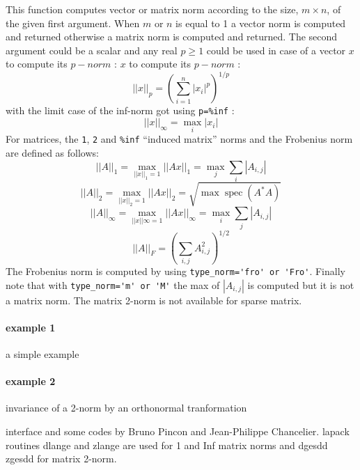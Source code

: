 \begin{mandescription}
This function computes vector or matrix norm according to the size, $m
\times n$, of the given first argument. When $m$ or $n$ is equal to 1 a vector
norm is computed and returned otherwise a matrix norm is computed and returned. 
The second argument could be a scalar and any real $p \ge 1$ could be used in case of a vector
$x$ to compute its $p-norm$ :
$x$ to compute its $p-norm$ :
$$
    ||x||_p = \left( \sum_{i=1}^n |x_i|^p \right)^{1/p}
$$
with the limit case of the inf-norm got using \verb+p=%inf+ :
$$
    ||x||_{\infty} = \max_i |x_i|
$$
For matrices, the \verb+1+, \verb+2+ and \verb+%inf+ ``induced matrix'' norms 
and the Frobenius norm are defined as follows:
$$
    ||A||_1 = \max_{||x||_1 = 1} ||Ax||_1 = \max_j \sum_i |A_{i,j}|  
$$
$$
    ||A||_2 = \max_{||x||_2 = 1} ||Ax||_2 = \sqrt{\max \mathop{\mathrm{spec}}(A^* A)}
$$
$$
    ||A||_{\infty} = \max_{||x||{\infty} = 1} ||Ax||_{\infty} = \max_i \sum_j |A_{i,j}|  
$$
$$
   ||A||_F =  \left( \sum_{i,j} A_{i,j}^2 \right)^{1/2}
$$
The Frobenius norm is computed by using  \verb+type_norm='fro' or 'Fro'+. 
Finally note that with \verb+type_norm='m' or 'M'+ the max 
of $|A_{i,j}|$ is computed but it is not a matrix norm.
The matrix 2-norm is not available for sparse matrix.
\end{mandescription}
\begin{examples}
\paragraph{example 1} a simple example
  \begin{program}
  \end{program}
\paragraph{example 2} invariance of a 2-norm by an orthonormal tranformation
  \begin{program}
  \end{program}
\end{examples}


\begin{authors}
   interface and some codes by Bruno Pincon and Jean-Philippe
   Chancelier. lapack routines dlange and zlange are used for
   1 and Inf matrix norms and dgesdd zgesdd for matrix 2-norm.
\end{authors}
